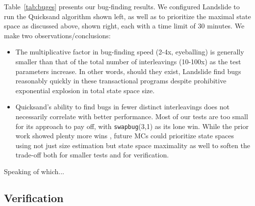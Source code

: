 \documentclass[10pt]{sigplanconf}
\begin{document}
Table~\ref{tab:buges}
presents our bug-finding results.
We configured Landslide to run the Quicksand algorithm \cite{quicksand}
shown left,
as well as to prioritize the maximal state space as discussed above,
shown right,
each with a time limit of 30 minutes.
We make two observations/conclusions:
\begin{itemize}
	\item The multiplicative factor in bug-finding speed (2-4x, eyeballing) is generally smaller
		than that of the total number of interleavings (10-100x)
		as the test parameters increase.
		In other words,
		should they exist,
		Landslide find bugs reasonably quickly in these transactional programs
		despite prohibitive exponential explosion in total state space size.
	\item Quicksand's ability to find bugs in fewer distinct interleavings %
		does not necessarily correlate with better performance. %
		Most of our tests are too small for its approach to pay off,
		with {\tt swapbug}(3,1) as its lone win.
		While the prior work showed plenty more wins \cite{quicksand},
		future MCs could prioritize state spaces using not just size estimation
		but state space maximality as well
		to soften the trade-off
		both for smaller tests and for verification.
\end{itemize}
Speaking of which...

\subsection{Verification}
\end{document}
